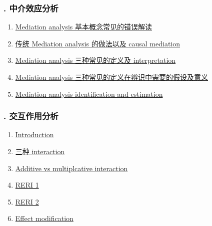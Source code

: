 \documentclass[11pt]{article}
\begin{document}
\vspace{-1cm}

\subsubsection*{. 中介效应分析}

\vspace{-0.5cm}

\begin{enumerate}
	\item \href{https://mp.weixin.qq.com/s/QVo-71WwLWt99ljKQOtXtg}{Mediation analysis 基本概念常见的错误解读}	%
	\item \href{https://mp.weixin.qq.com/s/tzJnVwOSfnCNbJtr9ksGUQ}{传统 Mediation analysis 的做法以及 causal mediation}	%
	\item \href{https://mp.weixin.qq.com/s/KPbpaspmIonZpCDdAFJbpQ}{Mediation analysis 三种常见的定义及 interpretation}	%
	\item \href{https://mp.weixin.qq.com/s/AoNnTWP3dMCCcmskwfvJ0g}{Mediation analysis 三种常见的定义在辨识中需要的假设及意义}	%
	\item \href{https://mp.weixin.qq.com/s/9hUGxYCy_a8UWkwXy78tAw}{Mediation analysis identification and estimation}	%
\end{enumerate}

\vspace{-1cm}

\subsubsection*{. 交互作用分析}

\vspace{-0.5cm}

\begin{multicols}{2}
	\begin{enumerate}
		\item \href{https://mp.weixin.qq.com/s/E7txm3jtXFuGbGS_b9yMFw}{Introduction}	%
		\item \href{https://mp.weixin.qq.com/s/t51Bs8d73iR8unozout9yA}{三种 interaction}	%
		\item \href{https://mp.weixin.qq.com/s/zcVLsoAjGCEkPOF5eASvjA}{Additive vs multiplcative interaction}	%
		\item \href{https://mp.weixin.qq.com/s/OVingr4LK-R979zHzAG3NA}{RERI 1}	%
		\item \href{https://mp.weixin.qq.com/s/RfIYqjLL90LQLCB0eryeLA}{RERI 2}	%
		\item \href{https://mp.weixin.qq.com/s/VW9h_Bztrchcg3tMyBM8zA}{Effect modification}	%
	\end{enumerate}
\end{multicols}
\end{document}
